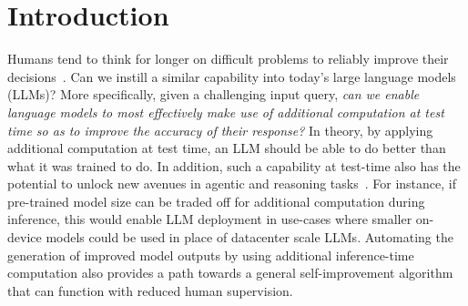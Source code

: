 \newcommand{\expect}[2]{\mathds{E}_{{#1}} \left[ {#2} \right]}
\newcommand{\myvec}[1]{\boldsymbol{#1}}
\newcommand{\myvecsym}[1]{\boldsymbol{#1}}
\newcommand{\vx}{\myvec{x}}
\newcommand{\vy}{\myvec{y}}
\newcommand{\vz}{\myvec{z}}
\newcommand{\vtheta}{\myvecsym{\theta}}

\vspace{-0.25cm}
\section{Introduction}
\vspace{-0.2cm}

Humans tend to think for longer on difficult problems to reliably improve their decisions~\citep{kahneman2013thinking,evans1984heuristic,kahneman2003maps}.
Can we instill a similar capability into today's large language models (LLMs)?  More specifically, given a challenging input query, \emph{can we enable language models to most effectively make use of additional computation at test time so as to improve the accuracy of their response?} In theory, by applying additional computation at test time, an LLM should be able to do better than what it was trained to do. In addition, such a capability at test-time also has the potential to unlock new avenues in agentic and reasoning tasks~\citep{shinn2023reflexion,wei2023chainofthought,qu2024recursive}.
For instance, if pre-trained model size can be traded off for additional computation during inference, this would enable LLM deployment in use-cases where smaller on-device models could be used in place of datacenter scale LLMs.
Automating the generation of improved model outputs by using additional inference-time computation also provides a path towards a general self-improvement algorithm that can function with reduced human supervision.

